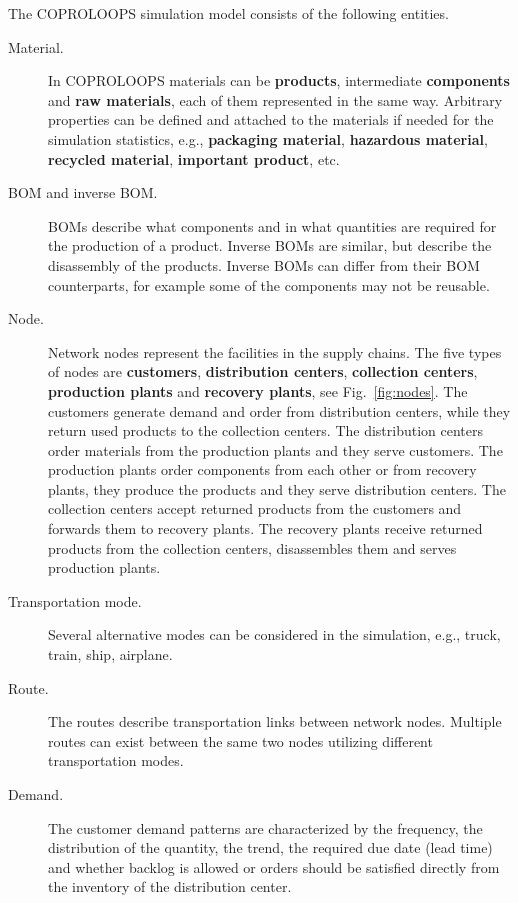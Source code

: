 \documentclass{article}
\newcommand{\NAME}{COPROLOOPS }
\begin{document}
The \NAME simulation model consists of the following entities.

\begin{description}
\item[Material.] In \NAME materials can be \textbf{products}, intermediate \textbf{components} and \textbf{raw materials}, each of them represented in the same way. Arbitrary properties can be defined and attached to the materials if needed for the simulation statistics, e.g., \textbf{packaging material}, \textbf{hazardous material}, \textbf{recycled material}, \textbf{important product}, etc.

\item[BOM and inverse BOM.] BOMs describe what components and in what quantities are required for the production of a product. Inverse BOMs are similar, but describe the disassembly of the products. Inverse BOMs can differ from their BOM counterparts, for example some of the components may not be reusable.

\item[Node.] Network nodes represent the facilities in the supply chains. The five types of nodes are \textbf{customers}, \textbf{distribution centers}, \textbf{collection centers}, \textbf{production plants} and \textbf{recovery plants}, see Fig.~\ref{fig:nodes}. The customers generate demand and order from distribution centers, while they return used products to the collection centers. The distribution centers order materials from the production plants and they serve customers. The production plants order components from each other or from recovery plants, they produce the products and they serve distribution centers. The collection centers accept returned products from the customers and forwards them to recovery plants. The recovery plants receive returned products from the collection centers, disassembles them and serves production plants.

\item[Transportation mode.] Several alternative modes can be considered in the simulation, e.g., truck, train, ship, airplane.

\item[Route.] The routes describe transportation links between network nodes. Multiple routes can exist between the same two nodes utilizing different transportation modes.

\item[Demand.] The customer demand patterns are characterized by the frequency, the distribution of the quantity, the trend, the required due date (lead time) and whether backlog is allowed or orders should be satisfied directly from the inventory of the distribution center.


\end{description}
\end{document}
